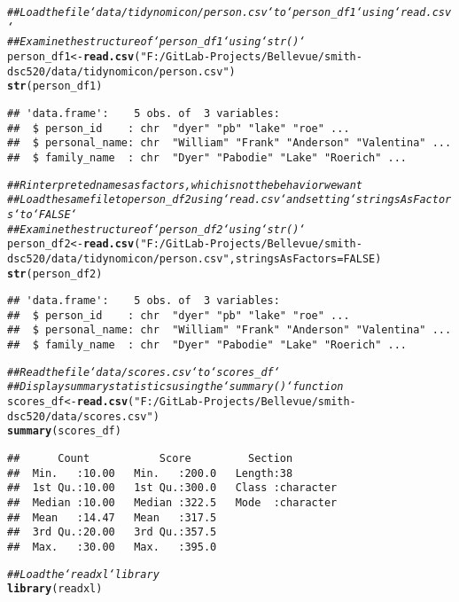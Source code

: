 \documentclass{article}\usepackage[]{graphicx}\usepackage[]{xcolor}
\makeatletter
\newcommand{\hlnum}[1]{\textcolor[rgb]{0.686,0.059,0.569}{#1}}%
\newcommand{\hlstr}[1]{\textcolor[rgb]{0.192,0.494,0.8}{#1}}%
\newcommand{\hlcom}[1]{\textcolor[rgb]{0.678,0.584,0.686}{\textit{#1}}}%
\newcommand{\hlstd}[1]{\textcolor[rgb]{0.345,0.345,0.345}{#1}}%
\newcommand{\hlkwb}[1]{\textcolor[rgb]{0.69,0.353,0.396}{#1}}%
\newcommand{\hlkwc}[1]{\textcolor[rgb]{0.333,0.667,0.333}{#1}}%
\newcommand{\hlkwd}[1]{\textcolor[rgb]{0.737,0.353,0.396}{\textbf{#1}}}%
\newenvironment{kframe}{%
 \def\at@end@of@kframe{}%
 \ifinner\ifhmode%
  \def\at@end@of@kframe{\end{minipage}}%
  \begin{minipage}{\columnwidth}%
 \fi\fi%
 \def\FrameCommand##1{\hskip\@totalleftmargin \hskip-\fboxsep
 \colorbox{shadecolor}{##1}\hskip-\fboxsep
     \hskip-\linewidth \hskip-\@totalleftmargin \hskip\columnwidth}%
 \MakeFramed {\advance\hsize-\width
   \@totalleftmargin\z@ \linewidth\hsize
   \@setminipage}}%
 {\par\unskip\endMakeFramed%
 \at@end@of@kframe}
\newenvironment{knitrout}{}{} %
\makeatother
\begin{document}
\begin{knitrout}
\begin{kframe}
\begin{alltt}
\hlcom{## Load the file `data/tidynomicon/person.csv` to `person_df1` using `read.csv`}
\hlcom{## Examine the structure of `person_df1` using `str()`}
\hlstd{person_df1} \hlkwb{<-} \hlkwd{read.csv}\hlstd{(}\hlstr{"F:/GitLab-Projects/Bellevue/smith-dsc520/data/tidynomicon/person.csv"}\hlstd{)}
\hlkwd{str}\hlstd{(person_df1)}
\end{alltt}
\begin{verbatim}
## 'data.frame':	5 obs. of  3 variables:
##  $ person_id    : chr  "dyer" "pb" "lake" "roe" ...
##  $ personal_name: chr  "William" "Frank" "Anderson" "Valentina" ...
##  $ family_name  : chr  "Dyer" "Pabodie" "Lake" "Roerich" ...
\end{verbatim}
\begin{alltt}
\hlcom{## R interpreted names as factors, which is not the behavior we want}
\hlcom{## Load the same file to person_df2 using `read.csv` and setting `stringsAsFactors` to `FALSE`}
\hlcom{## Examine the structure of `person_df2` using `str()`}
\hlstd{person_df2} \hlkwb{<-} \hlkwd{read.csv}\hlstd{(}\hlstr{"F:/GitLab-Projects/Bellevue/smith-dsc520/data/tidynomicon/person.csv"}\hlstd{,} \hlkwc{stringsAsFactors}\hlstd{=}\hlnum{FALSE}\hlstd{)}
\hlkwd{str}\hlstd{(person_df2)}
\end{alltt}
\begin{verbatim}
## 'data.frame':	5 obs. of  3 variables:
##  $ person_id    : chr  "dyer" "pb" "lake" "roe" ...
##  $ personal_name: chr  "William" "Frank" "Anderson" "Valentina" ...
##  $ family_name  : chr  "Dyer" "Pabodie" "Lake" "Roerich" ...
\end{verbatim}
\begin{alltt}
\hlcom{## Read the file `data/scores.csv` to `scores_df`}
\hlcom{## Display summary statistics using the `summary()` function}
\hlstd{scores_df} \hlkwb{<-} \hlkwd{read.csv}\hlstd{(}\hlstr{"F:/GitLab-Projects/Bellevue/smith-dsc520/data/scores.csv"}\hlstd{)}
\hlkwd{summary}\hlstd{(scores_df)}
\end{alltt}
\begin{verbatim}
##      Count           Score         Section         
##  Min.   :10.00   Min.   :200.0   Length:38         
##  1st Qu.:10.00   1st Qu.:300.0   Class :character  
##  Median :10.00   Median :322.5   Mode  :character  
##  Mean   :14.47   Mean   :317.5                     
##  3rd Qu.:20.00   3rd Qu.:357.5                     
##  Max.   :30.00   Max.   :395.0
\end{verbatim}
\begin{alltt}
\hlcom{## Load the `readxl` library}
\hlkwd{library}\hlstd{(readxl)}


\end{alltt}
\end{kframe}
\end{knitrout}
\end{document}

